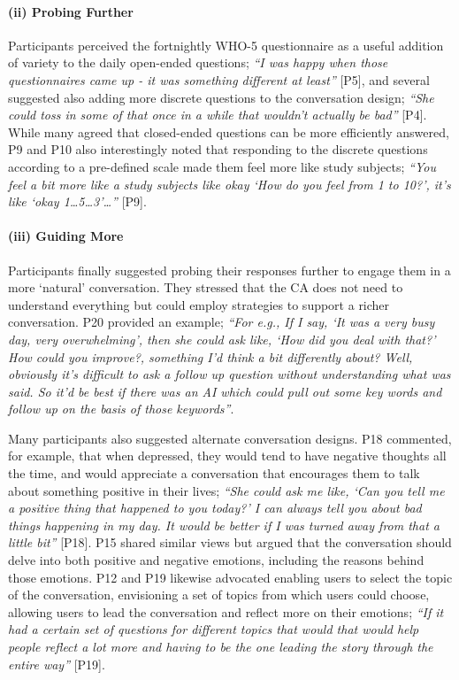             \paragraph{(ii) Probing Further}
            
                Participants perceived the fortnightly \ac{WHO-5} questionnaire as a useful addition of variety to the daily open-ended questions; \textit{``I was happy when those questionnaires came up - it was something different at least''} [P5], and several suggested also adding more discrete questions to the conversation design; \textit{``She could toss in some of that once in a while that wouldn't actually be bad''} [P4]. While many agreed that closed-ended questions can be more efficiently answered, P9 and P10 also interestingly noted that responding to the discrete questions according to a pre-defined scale made them feel more like study subjects; \textit{``You feel a bit more like a study subjects like okay `How do you feel from 1 to 10?', it's like `okay 1\ldots 5\ldots 3'\ldots''} [P9]. 
                
            \paragraph{(iii) Guiding More}
                
                Participants finally suggested probing their responses further to engage them in a more `natural' conversation. They stressed that the \ac{CA} does not need to understand everything but could employ strategies to support a richer conversation. P20 provided an example; \textit{``For e.g., If I say, `It was a very busy day, very overwhelming', then she could ask like, `How did you deal with that?' How could you improve?, something I’d think a bit differently about? Well, obviously it’s difficult to ask a follow up question without understanding what was said. So it’d be best if there was an \ac{AI} which could pull out some key words and follow up on the basis of those keywords''}.

                Many participants also suggested alternate conversation designs. P18 commented, for example, that when depressed, they would tend to have negative thoughts all the time, and would appreciate a conversation that encourages them to talk about something positive in their lives; \textit{``She could ask me like, `Can you tell me a positive thing that happened to you today?' I can always tell you about bad things happening in my day. It would be better if I was turned away from that a little bit''} [P18]. P15 shared similar views but argued that the conversation should delve into both positive and negative emotions, including the reasons behind those emotions. P12 and P19 likewise advocated enabling users to select the topic of the conversation, envisioning a set of topics from which users could choose, allowing users to lead the conversation and reflect more on their emotions; \textit{``If it had a certain set of questions for different topics that would that would help people reflect a lot more and having to be the one leading the story through the entire way''} [P19].

